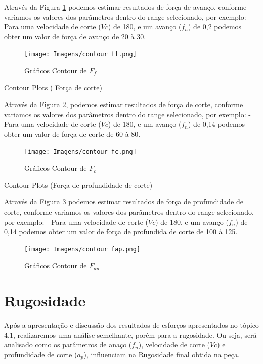 \documentclass[deposito, acronym, symbols]{fei}
\begin{document}
Através da Figura \ref{fig:cff} podemos estimar resultados de força de avanço, conforme variamos os valores dos parâmetros dentro do range selecionado, por exemplo: 
- Para uma velocidade de corte ($Vc$) de 180, e um avanço ($f_n$) de 0,2 podemos obter um valor de força de avanço de 20 à 30. 

\begin{figure}[!htp]
    \centering
    \caption{Gráficos Contour de $F_f$}
    \texttt{[image: Imagens/contour ff.png]}
    \label{fig:cff}
\end{figure}

Contour Plots ( Força de corte)

Através da Figura \ref{fig:cfc}, podemos estimar resultados de força de corte, conforme variamos os valores dos parâmetros dentro do range selecionado, por exemplo: 
- Para uma velocidade de corte ($Vc$) de 180, e um avanço ($f_n$) de 0,14 podemos obter um valor de força de corte de 60 à 80. 

\begin{figure}[!htp]
    \centering
    \caption{Gráficos Contour de $F_c$}
    \texttt{[image: Imagens/contour fc.png]}
    \label{fig:cfc}
\end{figure}

Contour Plots (Força de profundidade de corte)

Através da Figura \ref{fig:cfap} podemos estimar resultados de força de profundidade de corte, conforme variamos os valores dos parâmetros dentro do range selecionado, por exemplo: 
- Para uma velocidade de corte ($Vc$) de 180, e um avanço ($f_n$) de 0,14 podemos obter um valor de força de profundida de corte de 100 à 125. 

\begin{figure}[!htp]
    \centering
    \caption{Gráficos Contour de $F_{ap}$}
    \texttt{[image: Imagens/contour fap.png]}
    \label{fig:cfap}
\end{figure}

\section{Rugosidade}

Após a apresentação e discussão dos resultados de esforços apresentados no tópico 4.1, realizaremos uma análise semelhante, porém para a rugosidade. Ou seja, será analisado como os parâmetros de anaço ($f_n$), velocidade de corte ($Vc$) e profundidade de corte ($a_p$), influenciam na Rugosidade final obtida na peça. 
\end{document}
